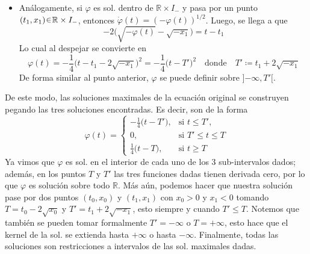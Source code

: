 \begin{sol}
\begin{itemize}
    \item Análogamente, si $\varphi$ es sol. dentro de $\mathbb{R} \times I_-$ y pasa por un punto $(t_1,x_1) \en \mathbb{R} \times I_-$, entonces $\dot\varphi(t) = (-\varphi(t))^{1/2}$. Luego, se llega a que 
    \[
        -2\Big(%
            \sqrt{-\varphi(t)} - \sqrt{-x_1}
        \Big)%
        = t - t_1
    \]
    Lo cual al despejar se convierte en 
    \[
        \varphi(t)%
        = -\frac14 \big(%
            t - t_1 - 2\sqrt{-x_1}
        \big)^2%
        = -\frac14 \big(%
            t-T'
        \big)^2%
        \quad\text{donde}\quad%
        T' \coloneq t_1 + 2\sqrt{-x_1}
    \]
    De forma similar al punto anterior, $\varphi$ se puede definir sobre $]{-\infty},T'[$.
\end{itemize}
De este modo, las soluciones maximales de la ecuación original se construyen pegando las tres soluciones encontradas. Es decir, son de la forma
\[
\varphi(t) =%
\begin{cases}
    -\frac14\big(t - T'\big), & \text{si } t \leq T',\\
    0,  & \text{si } T' \leq t \leq T\\
    \frac14\big(t - T\big), & \text{si } t \geq T
\end{cases}
\]
Ya vimos que $\varphi$ es sol. en el interior de cada uno de los $3$ sub-intervalos dados; además, en los puntos $T$ y $T'$ las tres funciones dadas tienen derivada cero, por lo que $\varphi$ es solución sobre todo $\mathbb{R}$. Más aún, podemos hacer que nuestra solución pase por dos puntos $(t_0,x_0)$ y $(t_1,x_1)$ con $x_0 > 0$ y $x_1 < 0$ tomando $T = t_0 - 2\sqrt{x_0}$ y $T' = t_1 + 2\sqrt{-x_1}$, esto siempre y cuando $T' \leq T$. Notemos que también se pueden tomar formalmente $T' = -\infty$ o $T = +\infty$, esto hace que el kernel de la sol. se extienda hasta $+\infty$ o hasta $-\infty$. Finalmente, todas las soluciones son restricciones a intervalos de las sol. maximales dadas.
\end{sol}



